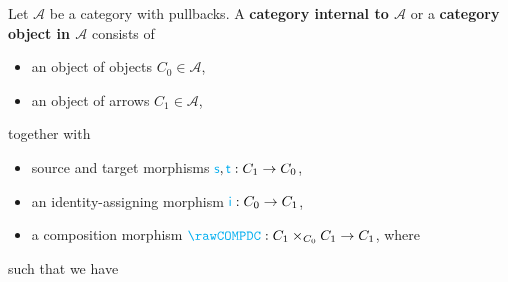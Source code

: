 \documentclass[noamsfonts, reqno]{amsart}
\newcommand\sDC{\mathcolor{cyan}{\mathsf{s}}}
\newcommand\tDC{\mathcolor{cyan}{\mathsf{t}}}
\newcommand\iDC{\mathcolor{cyan}{\mathsf{i}}}
\newcommand{\COMPDC}{\mathcolor{cyan}{\rawCOMPDC}}
\newcommand\DEF[1]{\textbf{#1}}
\begin{document}
\newcommand\CAT{\underline{\mathbf{Cat}}}
\newcommand\GRP{\underline{\mathbf{Grp}}}
\newcommand\GRPD{\underline{\mathbf{Grpd}}}
\newcommand\SET{\underline{\mathbf{Set}}}
\newcommand\obj{\mathsf{obj}}
\renewcommand\hom{\mathsf{hom}}

\newcommand\mGO{\magenta{\mathsf{m}}}
\newcommand\eGO{\magenta{\mathsf{e}}}
\newcommand\uGO{\magenta{\mathsf{u}}}
\newcommand\groupUnit{\mathsf{e}}

Let $\mathcal A$ be a category with pullbacks.
A \DEF{category internal to $\mathcal A$} or
a \DEF{category object in $\mathcal A$} 
consists of
\begin{itemize}
	\item an object of objects $C_0 \in \mathcal A$,
	\item an object of arrows $C_1 \in \mathcal A$,
\end{itemize}
together with
\begin{itemize}
	\item source and target morphisms $\sDC,\tDC: C_1 \to C_0$,
	\item an identity-assigning morphism $\iDC: C_0 \to C_1$,
	\item
	a composition morphism $\COMPDC: C_1 \times_{C_0} C_1 \to C_1$,
		where
		\begin{center}
		\end{center}

\end{itemize}
such that we have
\end{document}

